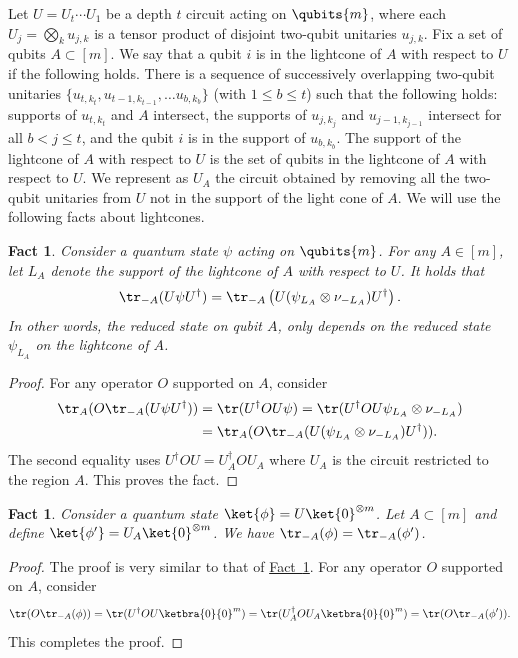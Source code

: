 \documentclass[11pt]{article}
\newcommand{\expref}[2]{\texorpdfstring{\hyperref[#2]{#1~\ref{#2}}}{#1~\ref{#2}}}
\newtheorem{fact}[theorem]{Fact}
\begin{document}
Let $U = U_t \cdots U_1$ be a depth $t$ circuit acting on $\qubits{m}$, where each $U_j = \bigotimes_k u_{j,k}$ is a tensor product of disjoint two-qubit unitaries $u_{j,k}$. Fix a set of qubits $A\subset [m]$. We say that a qubit $i$ is in the lightcone of $A$ with respect to $U$ if the following holds. There is a sequence of successively overlapping two-qubit unitaries $\{u_{t,k_t}, u_{t-1,k_{t-1}},\ldots u_{b,k_b}\}$ (with $1\leq b \leq t$) such that the following holds: supports of $u_{t,k_t}$ and $A$ intersect, the supports of $u_{j,k_j}$ and $u_{j-1,k_{j-1}}$ intersect for all $b< j\leq t$, and the qubit $i$ is in the support of $u_{b,k_b}$. The support of the lightcone of $A$ with respect to $U$ is the set of qubits in the lightcone of $A$ with respect to $U$. We represent as $U_{A}$ the circuit obtained by removing all the two-qubit unitaries from $U$ not in the support of the light cone of $A$. We will use the following facts about lightcones.

\begin{fact}
\label{fact:lightfact2}
Consider a quantum state $\psi$ acting on $\qubits{m}$. For any $A\in [m]$, let $L_A$ denote the support of the lightcone of $A$ with respect to $U$. It holds that
\begin{align}\tr_{-A}(U\psi U^{\dagger}) = \tr_{-A}\left(U (\psi_{L_A}\otimes \nu_{-L_A})U^{\dagger}\right).
\end{align}
In other words, the reduced %
state on qubit $A$, only depends on the reduced %
state $\psi_{L_A}$ on the lightcone of $A$.
\end{fact}
\begin{proof}
For any operator $O$ supported on $A$, consider 
\begin{align}
\tr_A(O\tr_{-A}(U\psi U^{\dagger}))&=\tr(U^{\dagger}O U \psi) = \tr(U^{\dagger}O U \psi_{L_A}\otimes \nu_{-L_A})\\
&=\tr_A(O\tr_{-A}(U(\psi_{L_A}\otimes \nu_{-L_A})U^{\dagger})).
\end{align}
The second equality uses $U^{\dagger}O U=U_A^{\dagger}O U_A$ where $U_A$ is the circuit restricted to the region $A$. This proves the fact.
\end{proof}

\begin{fact}
\label{fact:lightfact3}
Consider a quantum state $\ket{\phi}=U\ket{0}^{\otimes m}$. Let $A\subset [m]$ and define $\ket{\phi'}=U_A\ket{0}^{\otimes m}$. We have $\tr_{-A}(\phi)=\tr_{-A}(\phi')$.
\end{fact}
\begin{proof}
The proof is very similar to that of \expref{Fact}{fact:lightfact2}. For any operator $O$ supported on $A$, consider 
\begin{align}
\tr(O\tr_{-A}(\phi))=\tr(U^{\dagger}O U \ketbra{0}{0}^m) = \tr(U_A^{\dagger}O U_A \ketbra{0}{0}^m)=\tr(O\tr_{-A}(\phi')).
\end{align}
This completes the proof.
\end{proof}
\end{document}
